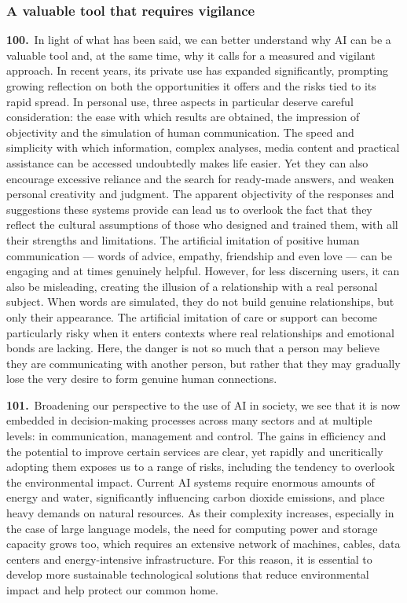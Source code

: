 \documentclass{article}
\begin{document}
\subsubsection{A valuable tool that requires vigilance}

\textbf{100.}\ In light of what has been said, we can better understand why AI can be a valuable tool and, at the same time, why it calls for a measured and vigilant approach. In recent years, its private use has expanded significantly, prompting growing reflection on both the opportunities it offers and the risks tied to its rapid spread. In personal use, three aspects in particular deserve careful consideration: the ease with which results are obtained, the impression of objectivity and the simulation of human communication. The speed and simplicity with which information, complex analyses, media content and practical assistance can be accessed undoubtedly makes life easier. Yet they can also encourage excessive reliance and the search for ready-made answers, and weaken personal creativity and judgment. The apparent objectivity of the responses and suggestions these systems provide can lead us to overlook the fact that they reflect the cultural assumptions of those who designed and trained them, with all their strengths and limitations. The artificial imitation of positive human communication --- words of advice, empathy, friendship and even love --- can be engaging and at times genuinely helpful. However, for less discerning users, it can also be misleading, creating the illusion of a relationship with a real personal subject. When words are simulated, they do not build genuine relationships, but only their appearance. The artificial imitation of care or support can become particularly risky when it enters contexts where real relationships and emotional bonds are lacking. Here, the danger is not so much that a person may believe they are communicating with another person, but rather that they may gradually lose the very desire to form genuine human connections.

\textbf{101.}\ Broadening our perspective to the use of AI in society, we see that it is now embedded in decision-making processes across many sectors and at multiple levels: in communication, management and control. The gains in efficiency and the potential to improve certain services are clear, yet rapidly and uncritically adopting them exposes us to a range of risks, including the tendency to overlook the environmental impact. Current AI systems require enormous amounts of energy and water, significantly influencing carbon dioxide emissions, and place heavy demands on natural resources. As their complexity increases, especially in the case of large language models, the need for computing power and storage capacity grows too, which requires an extensive network of machines, cables, data centers and energy-intensive infrastructure. For this reason, it is essential to develop more sustainable technological solutions that reduce environmental impact and help protect our common home.\cite{n124}
\end{document}
